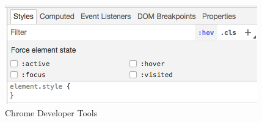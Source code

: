 \begin{figure}[h]
\caption{Chrome Developer Tools}
  \label{fig:tools}
\includegraphics{../public/images/tools}
\centering
\end{figure}
%
%
%
%
%

